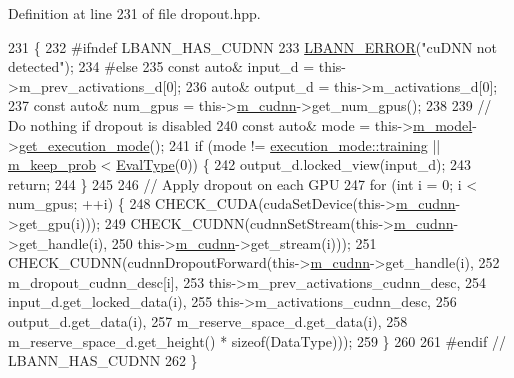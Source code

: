 Definition at line 231 of file dropout.\+hpp.


\begin{DoxyCode}
231                         \{
232 \textcolor{preprocessor}{  #ifndef LBANN\_HAS\_CUDNN}
233     \hyperlink{base_8hpp_a80b1d707117e968a6951b7222e4b2b87}{LBANN\_ERROR}(\textcolor{stringliteral}{"cuDNN not detected"});
234 \textcolor{preprocessor}{  #else }
235     \textcolor{keyword}{const} \textcolor{keyword}{auto}& input\_d = this->m\_prev\_activations\_d[0];
236     \textcolor{keyword}{auto}& output\_d = this->m\_activations\_d[0];
237     \textcolor{keyword}{const} \textcolor{keyword}{auto}& num\_gpus = this->\hyperlink{classlbann_1_1Layer_a08dbb94239e3b8c96329786c57c72e21}{m\_cudnn}->get\_num\_gpus();
238 
239     \textcolor{comment}{// Do nothing if dropout is disabled}
240     \textcolor{keyword}{const} \textcolor{keyword}{auto}& mode = this->\hyperlink{classlbann_1_1Layer_a3d9315e99574166f2f33e37b572021d2}{m\_model}->\hyperlink{classlbann_1_1model_addb40597cf29aa6d31b6a7d09ef48608}{get\_execution\_mode}();
241     \textcolor{keywordflow}{if} (mode != \hyperlink{base_8hpp_a2781a159088df64ed7d47cc91c4dc0a8ac185ddac8b5a8f5aa23c5b80bc12d214}{execution\_mode::training} || \hyperlink{classlbann_1_1dropout_aa06cbee70f3426b589990889b8ac8872}{m\_keep\_prob} < 
      \hyperlink{base_8hpp_a3266f5ac18504bbadea983c109566867}{EvalType}(0)) \{
242       output\_d.locked\_view(input\_d);
243       \textcolor{keywordflow}{return};
244     \}
245 
246     \textcolor{comment}{// Apply dropout on each GPU}
247     \textcolor{keywordflow}{for} (\textcolor{keywordtype}{int} i = 0; i < num\_gpus; ++i) \{
248       CHECK\_CUDA(cudaSetDevice(this->\hyperlink{classlbann_1_1Layer_a08dbb94239e3b8c96329786c57c72e21}{m\_cudnn}->get\_gpu(i)));
249       CHECK\_CUDNN(cudnnSetStream(this->\hyperlink{classlbann_1_1Layer_a08dbb94239e3b8c96329786c57c72e21}{m\_cudnn}->get\_handle(i),
250                                  this->\hyperlink{classlbann_1_1Layer_a08dbb94239e3b8c96329786c57c72e21}{m\_cudnn}->get\_stream(i)));
251       CHECK\_CUDNN(cudnnDropoutForward(this->\hyperlink{classlbann_1_1Layer_a08dbb94239e3b8c96329786c57c72e21}{m\_cudnn}->get\_handle(i),
252                                       m\_dropout\_cudnn\_desc[i],
253                                       this->m\_prev\_activations\_cudnn\_desc,
254                                       input\_d.get\_locked\_data(i),
255                                       this->m\_activations\_cudnn\_desc,
256                                       output\_d.get\_data(i),
257                                       m\_reserve\_space\_d.get\_data(i),
258                                       m\_reserve\_space\_d.get\_height() * \textcolor{keyword}{sizeof}(DataType)));
259     \}
260 
261 \textcolor{preprocessor}{  #endif // LBANN\_HAS\_CUDNN}
262   \}
\end{DoxyCode}
